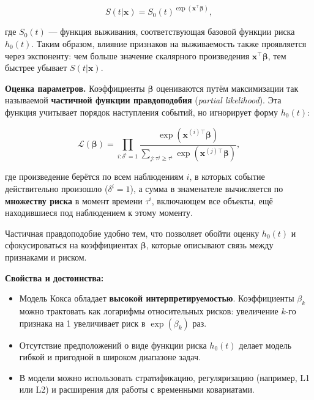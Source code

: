\documentclass[a4paper,14pt,oneside,openany]{memoir}
\begin{document}
\begin{equation}
	S(t|\mathbf{x}) = S_0(t)^{\exp(\mathbf{x}^\top \boldsymbol{\beta})},
\end{equation}

где $S_0(t)$ — функция выживания, соответствующая базовой функции риска $h_0(t)$. Таким образом, влияние признаков на выживаемость также проявляется через экспоненту: чем больше значение скалярного произведения $\mathbf{x}^\top \boldsymbol{\beta}$, тем быстрее убывает $S(t|\mathbf{x})$.

\vspace{1em}
\noindent
\textbf{Оценка параметров.} Коэффициенты $\boldsymbol{\beta}$ оцениваются путём максимизации так называемой \textbf{частичной функции правдоподобия} (\textit{partial likelihood}). Эта функция учитывает порядок наступления событий, но игнорирует форму $h_0(t)$:

\begin{equation}
	\mathcal{L}(\boldsymbol{\beta}) = \prod_{i:\delta^i=1} \frac{\exp(\mathbf{x}^{(i)\top} \boldsymbol{\beta})}{\sum_{j:\tau^j \geq \tau^i} \exp(\mathbf{x}^{(j)\top} \boldsymbol{\beta})},
\end{equation}

где произведение берётся по всем наблюдениям $i$, в которых событие действительно произошло ($\delta^i = 1$), а сумма в знаменателе вычисляется по \textbf{множеству риска} в момент времени $\tau^i$, включающем все объекты, ещё находившиеся под наблюдением к этому моменту.

\vspace{1em}
\noindent
Частичная правдоподобие удобно тем, что позволяет обойти оценку $h_0(t)$ и сфокусироваться на коэффициентах $\boldsymbol{\beta}$, которые описывают связь между признаками и риском.

\vspace{1em}
\noindent
\textbf{Свойства и достоинства:}
\begin{itemize}
	\item Модель Кокса обладает \textbf{высокой интерпретируемостью}. Коэффициенты $\beta_k$ можно трактовать как логарифмы относительных рисков: увеличение $k$-го признака на 1 увеличивает риск в $\exp(\beta_k)$ раз.
	\item Отсутствие предположений о виде функции риска $h_0(t)$ делает модель гибкой и пригодной в широком диапазоне задач.
	\item В модели можно использовать стратификацию, регуляризацию (например, L1 или L2) и расширения для работы с временными ковариатами.
\end{itemize}
\end{document}
